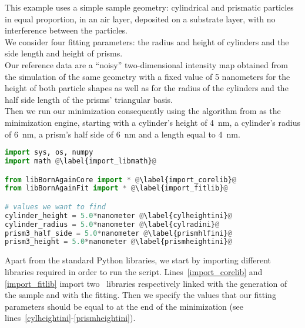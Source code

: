 \noindent This example uses a simple sample geometry: cylindrical and
prismatic particles in equal proportion, in an air layer, deposited on a substrate layer, with no interference
between the particles.\\ We consider four fitting parameters: the radius and height of cylinders and the
side length and height of prisms.\\  Our reference data are a ``noisy'' two-dimensional intensity
map obtained from the simulation of the same geometry with a fixed
value of 5 nanometers for the height of both particle shapes as well
as for the radius of the cylinders and the half side length of the
prisms' triangular basis. \\ Then we run our minimization consequently
using the algorithm  from  as the minimization engine, starting with a cylinder's height
of 4~nm, a cylinder's radius of 6~nm, a prism's half side of 6~nm
and a length equal to 4~nm.\\



\begin{lstlisting}[language=python, style=eclipseboxed, name=exfit,nolol]
import sys, os, numpy 
import math @\label{import_libmath}@

from libBornAgainCore import * @\label{import_corelib}@
from libBornAgainFit import * @\label{import_fitlib}@

# values we want to find
cylinder_height = 5.0*nanometer @\label{cylheightini}@
cylinder_radius = 5.0*nanometer @\label{cylradini}@
prism3_half_side = 5.0*nanometer @\label{prismhlfini}@
prism3_height = 5.0*nanometer @\label{prismheightini}@
\end{lstlisting}

Apart from the standard Python libraries, we start by importing different libraries required in order to run the script.
Lines~\ref{import_corelib} and \ref{import_fitlib} import two
\BornAgain\ libraries respectively linked with the generation of the
sample and with the fitting. Then we specify the values that our fitting parameters should be equal
to at the end of the minimization (see lines~\ref{cylheightini}-\ref{prismheightini}).

